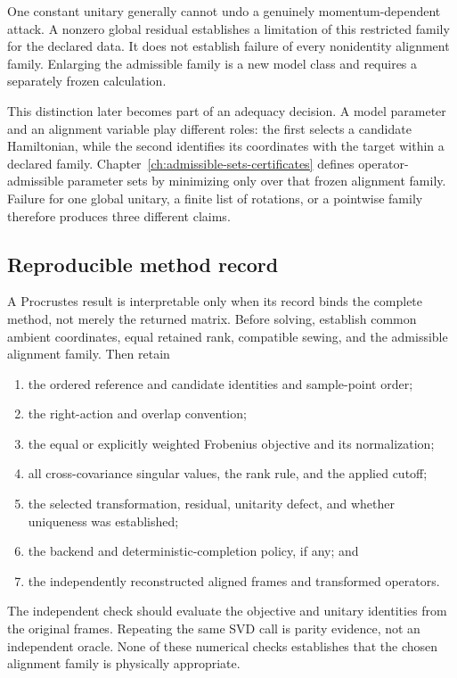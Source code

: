 One constant unitary generally cannot undo a genuinely momentum-dependent
attack. A nonzero global residual establishes a limitation of this restricted
family for the declared data. It does not establish failure of every
nonidentity alignment family. Enlarging the admissible family is a new model
class and requires a separately frozen calculation.

This distinction later becomes part of an adequacy decision. A model parameter
and an alignment variable play different roles: the first selects a candidate
Hamiltonian, while the second identifies its coordinates with the target
within a declared family. Chapter~\ref{ch:admissible-sets-certificates} defines
operator-admissible parameter sets by minimizing only over that frozen
alignment family. Failure for one global unitary, a finite list of rotations,
or a pointwise family therefore produces three different claims.

\subsection{Reproducible method record}

A Procrustes result is interpretable only when its record binds the complete
method, not merely the returned matrix. Before solving, establish common
ambient coordinates, equal retained rank, compatible sewing, and the admissible
alignment family. Then retain

\begin{enumerate}
  \item the ordered reference and candidate identities and sample-point order;
  \item the right-action and overlap convention;
  \item the equal or explicitly weighted Frobenius objective and its
        normalization;
  \item all cross-covariance singular values, the rank rule, and the applied
        cutoff;
  \item the selected transformation, residual, unitarity defect, and whether
        uniqueness was established;
  \item the backend and deterministic-completion policy, if any; and
  \item the independently reconstructed aligned frames and transformed
        operators.
\end{enumerate}

The independent check should evaluate the objective and unitary identities from
the original frames. Repeating the same SVD call is parity evidence, not an
independent oracle. None of these numerical checks establishes that the chosen
alignment family is physically appropriate.

